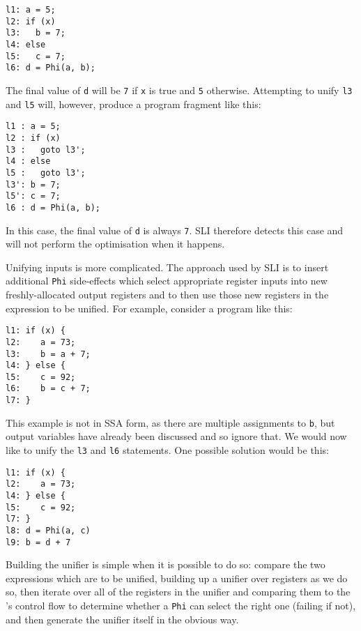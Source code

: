 \begin{verbatim}
l1: a = 5;
l2: if (x)
l3:   b = 7;
l4: else
l5:   c = 7;
l6: d = Phi(a, b);
\end{verbatim}

The final value of \verb|d| will be \verb|7| if \verb|x| is true and
\verb|5| otherwise.  Attempting to unify \verb|l3| and \verb|l5| will,
however, produce a program fragment like this:

\begin{verbatim}
l1 : a = 5;
l2 : if (x)
l3 :   goto l3';
l4 : else
l5 :   goto l3';
l3': b = 7;
l5': c = 7;
l6 : d = Phi(a, b);
\end{verbatim}

In this case, the final value of \verb|d| is always \verb|7|.  SLI
therefore detects this case and will not perform the optimisation when
it happens.

Unifying inputs is more complicated.  The approach used by SLI is to
insert additional \verb|Phi| side-effects which select appropriate
register inputs into new freshly-allocated output registers and to
then use those new registers in the expression to be unified.  For
example, consider a program like this:

\begin{verbatim}
l1: if (x) {
l2:    a = 73;
l3:    b = a + 7;
l4: } else {
l5:    c = 92;
l6:    b = c + 7;
l7: }
\end{verbatim}

This example is not in SSA form, as there are multiple assignments to
\verb|b|, but output variables have already been discussed and so
ignore that.  We would now like to
unify the \verb|l3| and \verb|l6| statements.  One possible solution
would be this:

\begin{verbatim}
l1: if (x) {
l2:    a = 73;
l4: } else {
l5:    c = 92;
l7: }
l8: d = Phi(a, c)
l9: b = d + 7
\end{verbatim}

Building the unifier is simple when it is possible to do so: compare
the two expressions which are to be unified, building up a unifier
over registers as we do so, then iterate over all of the registers in
the unifier and comparing them to the \StateMachine's control flow to
determine whether a \verb|Phi| can select the right one (failing if
not), and then generate the unifier itself in the obvious way.


